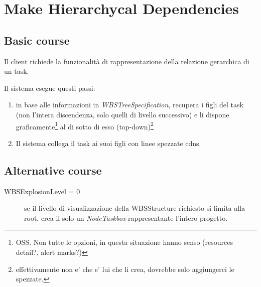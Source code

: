 \section{Make Hierarchycal Dependencies}
\label{seq:makeHierarchycalDependencies}
\subsection{Basic course}
Il client richiede la funzionalità di rappresentazione della relazione 
gerarchica di un task.

Il sistema esegue questi passi:
\begin{enumerate}
  \item in base alle informazioni in \emph{WBSTreeSpecification}, recupera i
  figli del task (non l’intera discendenza, solo quelli di livello successivo) e
  li dispone graficamente\footnote{OSS. Non tutte le opzioni, in questa
  situazione hanno senso (resources detail?, alert marks?)} al di sotto di esso (top-down)\footnote{effettivamente non e' che e' lui che li crea, dovrebbe
  solo aggiungerci le spezzate.}
  \item Il sistema collega il task ai suoi figli con linee spezzate cdns.
\end{enumerate}

\subsection{Alternative course}
\begin{description}
\item[WBSExplosionLevel = 0] se il livello di visualizzazione della WBSStructure
richiesto si limita alla root, crea il solo un \emph{NodeTaskbox} rappresentante
l’intero progetto.
\end{description}

